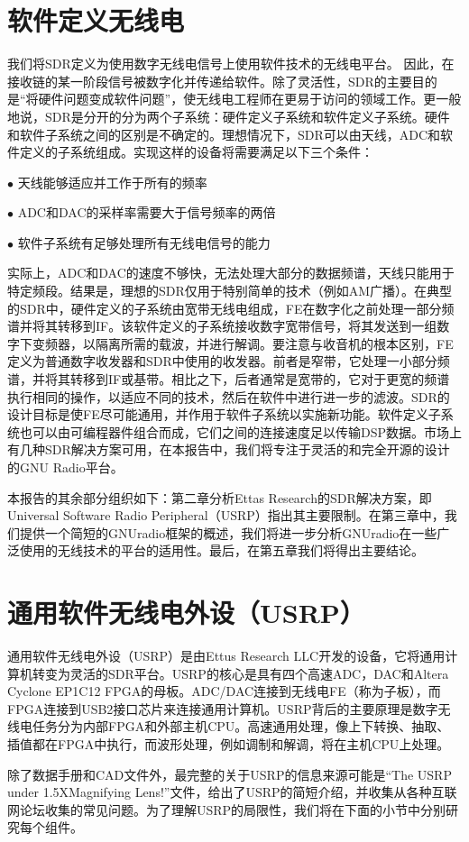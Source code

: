 \section{软件定义无线电}
\par 我们将SDR定义为使用数字无线电信号上使用软件技术的无线电平台。 因此，在接收链的某一阶段信号被数字化并传递给软件。除了灵活性，SDR的主要目的是“将硬件问题变成软件问题”，使无线电工程师在更易于访问的领域工作。更一般地说，SDR是分开的分为两个子系统：硬件定义子系统和软件定义子系统。硬件和软件子系统之间的区别是不确定的。理想情况下，SDR可以由天线，ADC和软件定义的子系统组成。实现这样的设备将需要满足以下三个条件：
\par $\bullet$ 天线能够适应并工作于所有的频率
\par $\bullet$ ADC和DAC的采样率需要大于信号频率的两倍
\par $\bullet$ 软件子系统有足够处理所有无线电信号的能力
\par 实际上，ADC和DAC的速度不够快，无法处理大部分的数据频谱，天线只能用于特定频段。结果是，理想的SDR仅用于特别简单的技术（例如AM广播）。在典型的SDR中，硬件定义的子系统由宽带无线电组成，FE在数字化之前处理一部分频谱并将其转移到IF。该软件定义的子系统接收数字宽带信号，将其发送到一组数字下变频器，以隔离所需的载波，并进行解调。要注意与收音机的根本区别，FE定义为普通数字收发器和SDR中使用的收发器。前者是窄带，它处理一小部分频谱，并将其转移到IF或基带。相比之下，后者通常是宽带的，它对于更宽的频谱执行相同的操作，以适应不同的技术，然后在软件中进行进一步的滤波。SDR的设计目标是使FE尽可能通用，并作用于软件子系统以实施新功能。软件定义子系统也可以由可编程器件组合而成，它们之间的连接速度足以传输DSP数据。市场上有几种SDR解决方案可用，在本报告中，我们将专注于灵活的和完全开源的设计的GNU Radio平台。
\par 本报告的其余部分组织如下：第二章分析Ettas Research的SDR解决方案，即Universal Software Radio Peripheral（USRP）指出其主要限制。在第三章中，我们提供一个简短的GNUradio框架的概述，我们将进一步分析GNUradio在一些广泛使用的无线技术的平台的适用性。最后，在第五章我们将得出主要结论。
\section{通用软件无线电外设（USRP）}
通用软件无线电外设（USRP）是由Ettus Research LLC开发的设备，它将通用计算机转变为灵活的SDR平台。USRP的核心是具有四个高速ADC，DAC和Altera Cyclone EP1C12 FPGA的母板。ADC/DAC连接到无线电FE（称为子板），而FPGA连接到USB2接口芯片来连接通用计算机。USRP背后的主要原理是数字无线电任务分为内部FPGA和外部主机CPU。高速通用处理，像上下转换、抽取、插值都在FPGA中执行，而波形处理，例如调制和解调，将在主机CPU上处理。
\par 除了数据手册和CAD文件外，最完整的关于USRP的信息来源可能是“The USRP under 1.5XMagnifying Lens!”文件，给出了USRP的简短介绍，并收集从各种互联网论坛收集的常见问题。为了理解USRP的局限性，我们将在下面的小节中分别研究每个组件。
